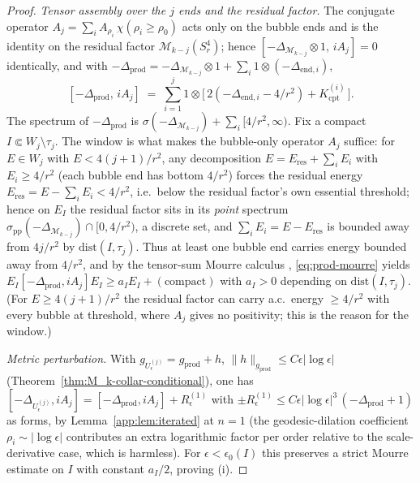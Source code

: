 \documentclass[11pt,letterpaper]{article}
\theoremstyle{definition}
\newcommand{\cM}{\mathcal{M}}
\newcommand{\Lap}{\Delta}
\begin{document}
\begin{proof}
\smallskip
\noindent\emph{Tensor assembly over the $j$ ends and the residual factor.} The conjugate operator $A_j = \sum_i A_{\rho_i}\,\chi(\rho_i\ge\rho_0)$ acts only on the bubble ends and is the identity on the residual factor $\cM_{k-j}(S^4_r)$; hence $[-\Lap_{\cM_{k-j}}\otimes 1,\,iA_j] = 0$ identically, and with $-\Lap_{\mathrm{prod}} = -\Lap_{\cM_{k-j}}\otimes 1 + \sum_i 1\otimes(-\Lap_{\mathrm{end},i})$,
\begin{equation}\label{eq:prod-mourre}
[-\Lap_{\mathrm{prod}},\,iA_j] \;=\; \sum_{i=1}^j 1\otimes\bigl[\,2(-\Lap_{\mathrm{end},i}-4/r^2) + K^{(i)}_{\mathrm{cpt}}\,\bigr].
\end{equation}
The spectrum of $-\Lap_{\mathrm{prod}}$ is $\sigma(-\Lap_{\cM_{k-j}}) + \sum_i[4/r^2,\infty)$. Fix a compact $I\Subset W_j\setminus\tau_j$. The window is what makes the bubble-only operator $A_j$ suffice: for $E\in W_j$ with $E < 4(j+1)/r^2$, any decomposition $E = E_{\mathrm{res}} + \sum_i E_i$ with $E_i\ge 4/r^2$ (each bubble end has bottom $4/r^2$) forces the residual energy $E_{\mathrm{res}} = E - \sum_i E_i < 4/r^2$, i.e.\ below the residual factor's own essential threshold; hence on $E_I$ the residual factor sits in its \emph{point} spectrum $\sigma_{\mathrm{pp}}(-\Lap_{\cM_{k-j}})\cap[0,4/r^2)$, a discrete set, and $\sum_i E_i = E - E_{\mathrm{res}}$ is bounded away from $4j/r^2$ by $\mathrm{dist}(I,\tau_j)$. Thus at least one bubble end carries energy bounded away from $4/r^2$, and by the tensor-sum Mourre calculus \cite[\S 8.3.4]{ABMG1996}, \eqref{eq:prod-mourre} yields $E_I[-\Lap_{\mathrm{prod}},iA_j]E_I \ge a_I E_I + (\text{compact})$ with $a_I>0$ depending on $\mathrm{dist}(I,\tau_j)$. (For $E\ge 4(j+1)/r^2$ the residual factor can carry a.c.\ energy $\ge 4/r^2$ with every bubble at threshold, where $A_j$ gives no positivity; this is the reason for the window.)

\smallskip
\noindent\emph{Metric perturbation.} With $g_{U_\epsilon^{(j)}} = g_{\mathrm{prod}} + h$, $\|h\|_{g_{\mathrm{prod}}}\le C\epsilon|\log\epsilon|$ (Theorem~\ref{thm:M_k-collar-conditional}), one has $[-\Lap_{U_\epsilon^{(j)}},iA_j] = [-\Lap_{\mathrm{prod}},iA_j] + R^{(1)}_\epsilon$ with $\pm R^{(1)}_\epsilon \le C\epsilon|\log\epsilon|^3\,(-\Lap_{\mathrm{prod}}+1)$ as forms, by Lemma~\ref{app:lem:iterated} at $n=1$ (the geodesic-dilation coefficient $\rho_i\sim|\log\epsilon|$ contributes an extra logarithmic factor per order relative to the scale-derivative case, which is harmless). For $\epsilon<\epsilon_0(I)$ this preserves a strict Mourre estimate on $I$ with constant $a_I/2$, proving (i).


\end{proof}
\end{document}
